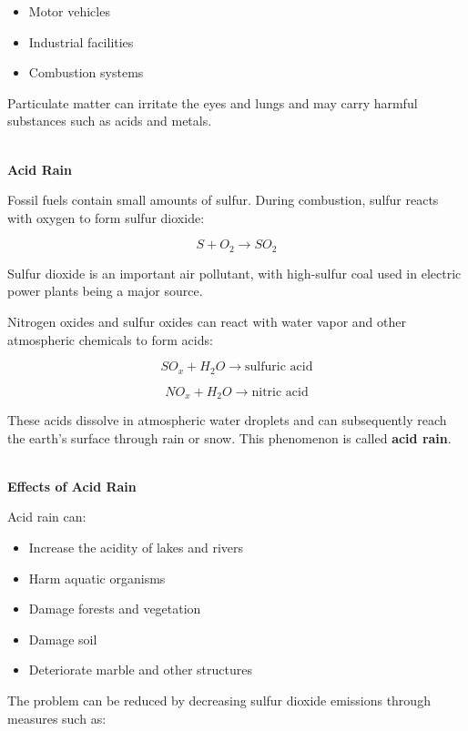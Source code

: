 \documentclass[12pt]{article}
\begin{document}
\begin{itemize}
    \item Motor vehicles
    \item Industrial facilities
    \item Combustion systems
\end{itemize}

Particulate matter can irritate the eyes and lungs and may carry harmful substances such as acids and metals.

\textbf{\\ Acid Rain}

Fossil fuels contain small amounts of sulfur. During combustion, sulfur reacts with oxygen to form sulfur dioxide:

\begin{equation*}
S+O_2\rightarrow SO_2
\end{equation*}

Sulfur dioxide is an important air pollutant, with high-sulfur coal used in electric power plants being a major source.

Nitrogen oxides and sulfur oxides can react with water vapor and other atmospheric chemicals to form acids:

\begin{equation*}
SO_x+H_2O
\rightarrow
\text{sulfuric acid}
\end{equation*}

\begin{equation*}
NO_x+H_2O
\rightarrow
\text{nitric acid}
\end{equation*}

These acids dissolve in atmospheric water droplets and can subsequently reach the earth's surface through rain or snow. This phenomenon is called \textbf{acid rain}.

\textbf{\\ Effects of Acid Rain}

Acid rain can:

\begin{itemize}
    \item Increase the acidity of lakes and rivers
    \item Harm aquatic organisms
    \item Damage forests and vegetation
    \item Damage soil
    \item Deteriorate marble and other structures
\end{itemize}

The problem can be reduced by decreasing sulfur dioxide emissions through measures such as:
\end{document}
